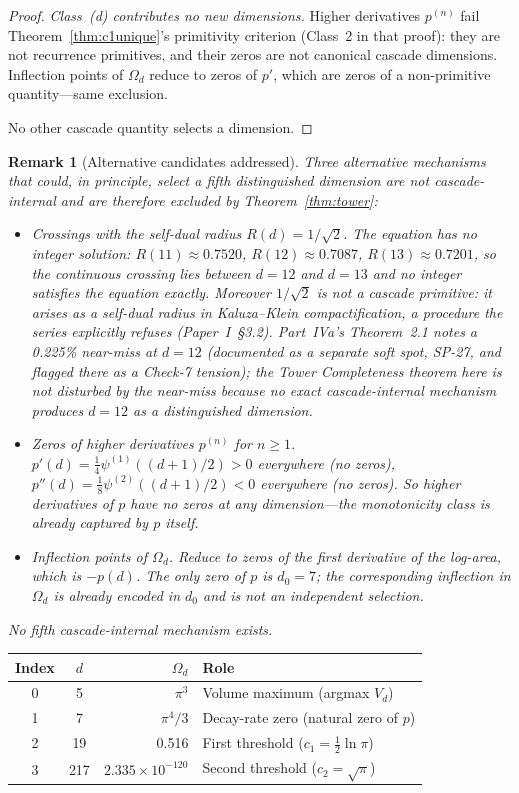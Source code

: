 \documentclass[11pt,a4paper]{article}
\newtheorem{remark}[theorem]{Remark}
\begin{document}
\begin{proof}
\emph{Class~(d) contributes no new dimensions.}
Higher derivatives $p^{(n)}$ fail Theorem~\ref{thm:c1unique}'s
primitivity criterion (Class~2 in that proof): they are not recurrence
primitives, and their zeros are not canonical cascade dimensions.
Inflection points of $\Omega_d$ reduce to zeros of $p'$, which are zeros
of a non-primitive quantity---same exclusion.

No other cascade quantity selects a dimension.
\end{proof}

\begin{remark}[Alternative candidates addressed]\label{rem:tower-alternatives}
Three alternative mechanisms that could, in principle, select a fifth
distinguished dimension are not cascade-internal and are therefore
excluded by Theorem~\ref{thm:tower}:
\begin{itemize}
\item \emph{Crossings with the self-dual radius $R(d) = 1/\sqrt{2}$.}
The equation has no integer solution: $R(11) \approx 0.7520$,
$R(12) \approx 0.7087$, $R(13) \approx 0.7201$, so the continuous
crossing lies between $d=12$ and $d=13$ and no integer satisfies the
equation exactly. Moreover $1/\sqrt{2}$ is not a cascade primitive: it
arises as a self-dual radius in Kaluza--Klein compactification, a
procedure the series explicitly refuses (Paper~I~\S3.2). Part~IVa's
Theorem~2.1 notes a 0.225\% near-miss at $d=12$ (documented as a
separate soft spot, SP-27, and flagged there as a Check-7 tension); the
Tower Completeness theorem here is not disturbed by the near-miss
because no exact cascade-internal mechanism produces $d=12$ as a
distinguished dimension.
\item \emph{Zeros of higher derivatives $p^{(n)}$ for $n\geq 1$.}
$p'(d) = \tfrac{1}{4}\psi^{(1)}((d+1)/2) > 0$ everywhere (no zeros),
$p''(d) = \tfrac{1}{8}\psi^{(2)}((d+1)/2) < 0$ everywhere (no zeros). So
higher derivatives of $p$ have no zeros at any dimension---the
monotonicity class is already captured by $p$ itself.
\item \emph{Inflection points of $\Omega_d$.} Reduce to zeros of the
first derivative of the log-area, which is $-p(d)$. The only zero of
$p$ is $d_0 = 7$; the corresponding inflection in $\Omega_d$ is already
encoded in $d_0$ and is not an independent selection.
\end{itemize}
No fifth cascade-internal mechanism exists.
\end{remark}

\begin{center}
\begin{tabular}{ccrl}
\toprule
Index & $d$ & $\Omega_d$ & Role \\
\midrule
0 & 5 & $\pi^3$ & Volume maximum (argmax $V_d$) \\
1 & 7 & $\pi^4/3$ & Decay-rate zero (natural zero of $p$) \\
2 & 19 & 0.516 & First threshold ($c_1 = \tfrac{1}{2}\ln\pi$) \\
3 & 217 & $2.335\times 10^{-120}$ &
Second threshold ($c_2 = \sqrt{\pi}$) \\
\bottomrule
\end{tabular}
\end{center}
\end{document}
